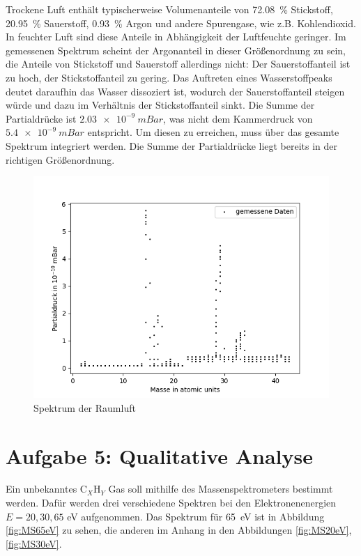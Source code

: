 Trockene Luft enthält typischerweise Volumenanteile von \SI{72.08}{\%} Stickstoff, \SI{20.95}{\%} Sauerstoff, \SI{0.93}{\%} Argon und andere Spurengase, wie z.B. Kohlendioxid\cite{Luft}. In feuchter Luft sind diese Anteile in Abhängigkeit der Luftfeuchte geringer. Im gemessenen Spektrum scheint der Argonanteil in dieser Größenordnung zu sein, die Anteile von Stickstoff und Sauerstoff allerdings nicht: Der Sauerstoffanteil ist zu hoch, der Stickstoffanteil zu gering. Das Auftreten eines Wasserstoffpeaks deutet daraufhin das Wasser dissoziert ist, wodurch der Sauerstoffanteil steigen würde und dazu im Verhältnis der Stickstoffanteil sinkt. Die Summe der Partialdrücke ist $\SI{2.03e-9}{mBar}$, was nicht dem Kammerdruck von $\SI{5.4e-9}{mBar}$ entspricht. Um diesen zu erreichen, muss über das gesamte Spektrum integriert werden. Die Summe der Partialdrücke liegt bereits in der richtigen Größenordnung. 


\begin{figure}[H]
    \centering
    \includegraphics[width=120mm,scale=0.8]{Massenspektrometer/include/MSzweitesSpektrum.png}
    \caption{Spektrum der Raumluft}
    \label{fig:MSzweitesSpektrum}
\end{figure}

\section{Aufgabe 5: Qualitative Analyse}
Ein unbekanntes $\text{C}_X\text{H}_Y$ Gas soll mithilfe des Massenspektrometers bestimmt werden. Dafür werden drei verschiedene Spektren bei den Elektronenenergien $E = {20,30,65} $ eV aufgenommen.
Das Spektrum für \SI{65}{eV} ist in Abbildung \ref{fig:MS65eV} zu sehen, die anderen im Anhang in den Abbildungen \ref{fig:MS20eV},\ref{fig:MS30eV}. 

